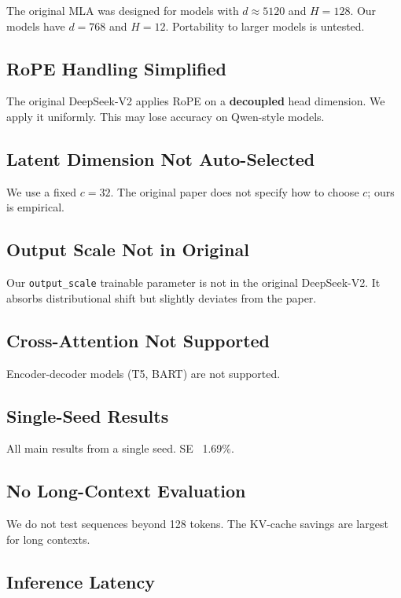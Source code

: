 The original MLA was designed for models with $d \approx 5120$ and 
$H = 128$. Our models have $d = 768$ and $H = 12$. Portability to 
larger models is untested.

\subsection{RoPE Handling Simplified}

The original DeepSeek-V2 applies RoPE on a \textbf{decoupled} head dimension. We 
apply it uniformly. This may lose accuracy on Qwen-style models.

\subsection{Latent Dimension Not Auto-Selected}

We use a fixed $c = 32$. The original paper does not specify how to 
choose $c$; ours is empirical.

\subsection{Output Scale Not in Original}

Our \texttt{output\_scale} trainable parameter is not in the original DeepSeek-V2. 
It absorbs distributional shift but slightly deviates from the paper.

\subsection{Cross-Attention Not Supported}

Encoder-decoder models (T5, BART) are not supported.

\subsection{Single-Seed Results}

All main results from a single seed. SE ~1.69\%.

\subsection{No Long-Context Evaluation}

We do not test sequences beyond 128 tokens. The KV-cache savings are 
largest for long contexts.

\subsection{Inference Latency}

